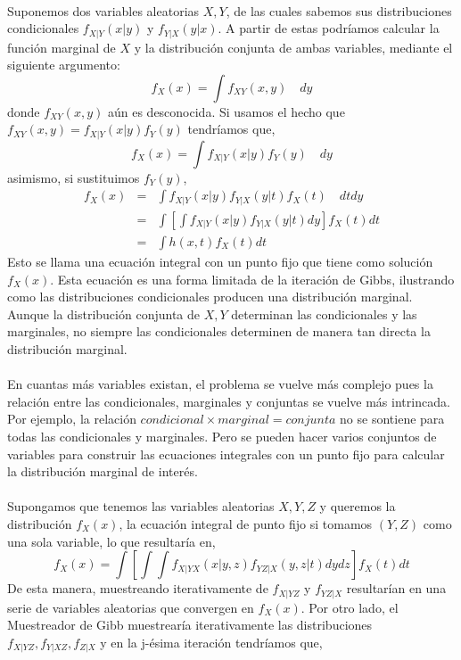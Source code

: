 \\
Suponemos dos variables aleatorias $X,Y$, de las cuales sabemos sus distribuciones condicionales $f_{X|Y}(x|y)$ y $f_{Y|X}(y|x)$. A partir de estas podr\'iamos calcular la funci\'on marginal de $X$ y la distribuci\'on conjunta de ambas variables, mediante  el siguiente argumento:\\
\[f_X(x)=\int f_{XY}(x,y)\quad dy\]
donde $f_{XY}(x,y)$ a\'un es desconocida. Si usamos el hecho que $f_{XY}(x,y)=f_{X|Y}(x|y)f_Y(y)$ tendr\'iamos que,\\
\[f_X(x)=\int f_{X|Y}(x|y)f_Y(y) \quad dy\]
asimismo, si sustituimos $f_Y(y)$,
\begin{eqnarray*}
f_X(x) &=& \int f_{X|Y}(x|y) f_{Y|X}(y|t) f_X(t) \quad dt dy\\
       &=& \int [ \int  f_{X|Y}(x|y)f_{Y|X}(y|t) dy]  f_X(t) dt\\
       &=& \int h(x,t) f_X(t) dt
\end{eqnarray*}
Esto se llama una ecuaci\'on integral con un punto fijo que tiene como soluci\'on $f_X(x)$. Esta ecuaci\'on es una forma limitada de la iteraci\'on de Gibbs, ilustrando como las distribuciones condicionales producen una distribuci\'on marginal. Aunque la distribuci\'on conjunta de $X,Y$ determinan las condicionales y las marginales, no siempre las condicionales determinen de manera tan directa la distribuci\'on marginal.\\
\\
En cuantas m\'as variables existan, el problema se vuelve m\'as complejo pues la relaci\'on entre las condicionales, marginales y conjuntas se vuelve m\'as intrincada. Por ejemplo, la relaci\'on $condicional \times marginal = conjunta$ no se sontiene para todas las condicionales y marginales. Pero se pueden hacer varios conjuntos de variables para construir las ecuaciones integrales con un punto fijo para calcular la distribuci\'on marginal de inter\'es.\\
\\
Supongamos que tenemos las variables aleatorias $X,Y,Z$ y queremos la distribuci\'on $f_X(x)$, la ecuaci\'on integral de punto fijo si tomamos $(Y,Z)$ como una sola variable, lo que resultar\'ia en,\\
\[f_X(x)= \int [ \int \int f_{X|YX}(x|y,z)f_{YZ|X}(y,z|t)dy dz] f_X(t) dt\]
De esta manera, muestreando iterativamente de $f_{X|YZ}$ y $f_{YZ|X}$ resultar\'ian en una serie de variables aleatorias que convergen en $f_X(x)$. Por otro lado, el Muestreador de Gibb muestrear\'ia iterativamente las distribuciones $f_{X|YZ}, f_{Y|XZ}, f_{Z|X}$ y en la j-\'esima iteraci\'on tendr\'iamos que,\\
